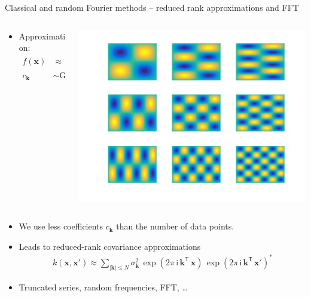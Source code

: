 \documentclass[first=dgreen,second=purple,presentation]{elecslides}
\begin{document}
\begin{frame}{Classical and random Fourier methods -- reduced rank approximations and FFT}
\begin{block}{}
\begin{columns}
\begin{column}{0.5\textwidth}
\begin{itemize}[<+->]
\item Approximation:
{\small
\begin{equation}
\begin{split}
  f(\mathbf{x}) &\approx \sum_{\mathbf{k} \in \mathbb{N}^d}
    c_\mathbf{k} \, \exp\left(2 \pi \, \mathrm{i} \, \mathbf{k}^\mathsf{T} \, \mathbf{x} \right) \\
    c_\mathbf{k} &\sim \text{Gaussian}
\end{split}
\nonumber
\end{equation}
}
\end{itemize}
\end{column}
\begin{column}{0.4\textwidth}
\includegraphics[width=1.0\columnwidth]{fourier}
\end{column}
\end{columns}
\end{block}

\begin{itemize}[<+->]
\setcounter{enumi}{2}
\item We use \alert{less coefficients} $c_\mathbf{k}$ than the \alert{number of data points}.
\item Leads to \alert{reduced-rank covariance approximations}
\begin{equation}
\begin{split}
  k(\mathbf{x},\mathbf{x}') \approx \sum_{|\mathbf{k}| \le N} 
    \sigma^2_{\mathbf{k}} \, \exp\left(2 \pi \, \mathrm{i} \, \mathbf{k}^\mathsf{T} \, \mathbf{x} \right)
    \, \exp\left(2 \pi \, \mathrm{i} \, \mathbf{k}^\mathsf{T} \, \mathbf{x}' \right)^*
\end{split}
\nonumber
\end{equation}
\item Truncated series, random frequencies, FFT, \ldots
\end{itemize}

\end{frame}
\end{document}
